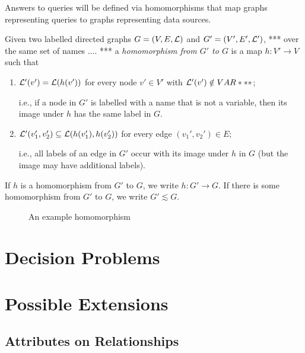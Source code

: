 Answers to queries will be defined via homomorphisms that map graphs representing queries
to graphs representing data sources.
%
\begin{definition}
  Given two labelled directed graphs $G = (V,E,\mathcal{L})$ and $G' = (V',E',\mathcal{L}')$,
  *** over the same set of names .... ***
  a \emph{homomorphism from $G'$ to $G$} is a map $h : V' \to V$ such that
  \begin{enumerate}
    \item
      $\mathcal{L}'(v') = \mathcal{L}(h(v'))$ for every node $v' \in V'$ with $\mathcal{L}'(v') \notin VAR***$;
      
      i.e., if a node in $G'$ is labelled with a name that is not a variable,
      then its image under $h$ has the same label in $G$.
    \item
      $\mathcal{L}'(v_1', v_2') \subseteq \mathcal{L}(h(v_1'), h(v_2'))$
      for every edge $(v_1',v_2') \in E$;
      
      i.e., all labels of an edge in $G'$ occur with its image under $h$ in $G$
      (but the image may have additional labels).
  \end{enumerate}
  If $h$ is a homomorphism from $G'$ to $G$, we write $h : G' \to G$.
  If there is some homomorphism from $G'$ to $G$, we write $G' \lesssim G$.
\end{definition}

\begin{figure}
  \caption{An example homomorphism}
  \label{fig:example_hmph}
\end{figure}

\section{Decision Problems}


\section{Possible Extensions}


\subsection*{Attributes on Relationships}

